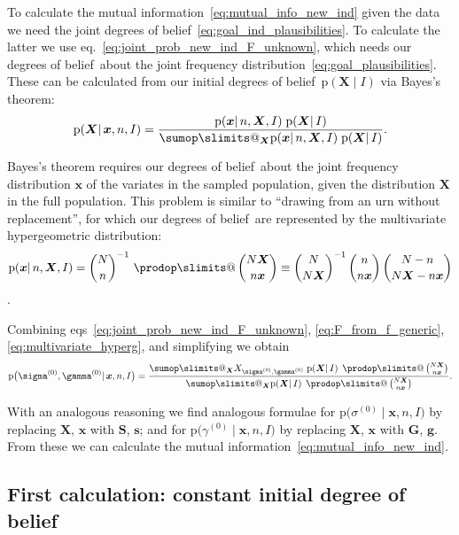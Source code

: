 \documentclass[\ifafour a4paper,12pt,\else a5paper,10pt,\fi%
onecolumn,oneside,article,%
british%
]{memoir}
\makeatletter
\theoremstyle{remark}
\theoremstyle{innote}
\def\sum{\DOTSI\sumop\slimits@}
\def\prod{\DOTSI\prodop\slimits@}
\newcommand*{\citep}{\parencites}
\newcommand*{\pf}{\mathrm{p}}%
\renewcommand*{\|}{\mathpunct{|}}
\newcommand*{\sect}{\S}%
\newcommand*{\chap}{ch.}%
\newcommand*{\eqn}{eq.}%
\newcommand*{\eqns}{eqs}%
\newcommand*{\tprod}{\mathop{\textstyle\prod}\nolimits}
\newcommand*{\dob}{degree of belief}
\newcommand*{\dobs}{degrees of belief}
\newcommand*{\yI}{I}
\newcommand*{\yprod}{\tprod}
\newcommand*{\ys}{\sigma}
\newcommand*{\yg}{\gamma}
\newcommand*{\ysi}[1]{\ys^{(#1)}}
\newcommand*{\ygi}[1]{\yg^{(#1)}}
\newcommand*{\yso}{\ysi{0}}
\newcommand*{\ygo}{\ygi{0}}
\newcommand*{\yFs}{\bm{S}}
\newcommand*{\yfs}{\bm{s}}
\newcommand*{\yFg}{\bm{G}}
\newcommand*{\yfg}{\bm{g}}
\newcommand*{\yF}{\bm{X}}
\newcommand*{\yf}{\bm{x}}
\makeatother
\begin{document}
\medskip

To calculate the mutual information~\eqref{eq:mutual_info_new_ind} given
the data we need the joint \dobs~\eqref{eq:goal_ind_plausibilities}. To
calculate the latter we use \eqn~\eqref{eq:joint_prob_new_ind_F_unknown},
which needs our \dobs\ about the joint frequency
distribution~\eqref{eq:goal_plausibilities}. These can be calculated from
our initial \dobs\ $\pf( \yF \| \yI)$ via Bayes's theorem:
\begin{equation}
  \label{eq:F_from_f_generic}
  \pf(\yF \| \yf, n, \yI) =
  \frac{\pf(\yf \| n,\yF, \yI)\; \pf(\yF \| \yI)}{
  \sum_{\yF}\pf(\yf \| n,\yF, \yI)\; \pf(\yF \| \yI)}.
\end{equation}

Bayes's theorem requires our \dobs\ about the joint frequency distribution
$\yf$ of the variates in the sampled population, given the distribution
$\yF$ in the full population. This problem is similar to \enquote{drawing
  from an urn without replacement}, for which our \dobs\ are represented by
the multivariate hypergeometric distribution:
\begin{equation}
  \label{eq:multivariate_hyperg}
  \pf(\yf \| n,\yF, \yI) =
  \binom{N}{n}^{-1}\,\yprod\binom{N\yF}{n\yf}
  \equiv \binom{N}{N\yF}^{-1}\,\binom{n}{n\yf}\,\binom{N-n}{N\yF-n\yf}
\end{equation}
\citep{ghoshetal1997}[parts~I, VI]{freedmanetal1978_r2007}[summaries
in][\chap~8]{gelmanetal1995_r2014}[\chap~3]{jaynes1994_r2003}[properties of
this distribution are discussed
in][\sect~4.8.3]{ross1976_r2010}[\sect~II.6]{feller1950_r1968}.

Combining \eqns~\eqref{eq:joint_prob_new_ind_F_unknown},
\eqref{eq:F_from_f_generic}, \eqref{eq:multivariate_hyperg}, and
simplifying we obtain
\begin{equation}
  \label{eq:joint_prob_new_ind_full}
  \pf\bigl(\yso, \ygo \| \yf, n,\yI\bigr)  =
  \frac{
    \sum_{\yF} X_{\yso, \ygo}\;
    \pf(\yF \| \yI)\;\yprod\binom{N\yF}{n\yf}}{
  \sum_{\yF} \pf(\yF \| \yI)\;\yprod\binom{N\yF}{n\yf}}.
\end{equation}

With an analogous reasoning we find analogous formulae for
$\pf\bigl(\yso \| \yf, n,\yI\bigr)$ by replacing $\yF$, $\yf$ with
$\yFs$, $\yfs$; and for $\pf\bigl(\ygo \| \yf, n,\yI\bigr)$ by
replacing $\yF$, $\yf$ with $\yFg$, $\yfg$. From these we can calculate the
mutual information~\eqref{eq:mutual_info_new_ind}.


\subsection{First calculation: constant initial \dob}
\label{sec:first_calc_const_prior}
\end{document}
